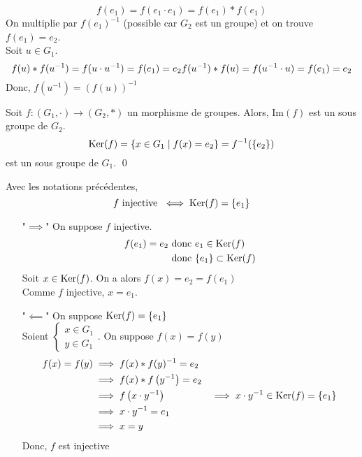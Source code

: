 \begin{prv}
	\[
	f(e_1) = f(e_1 \cdot e_1) = f(e_1) * f(e_1)
	\] On multiplie par $f(e_1)^{-1}$ (possible car $G_2$ est un groupe) et on trouve $f(e_1) = e_2$.\\
	Soit $u \in G_1$. \[
	f(u) * f(u ^{-1}) = f(u \cdot u^{-1}) = f(e_1) = e_2\\
	f(u^{-1}) * f(u) = f(u^{-1} \cdot u) = f(e_1) = e_2\\
	\] Donc, $f\left(u^{-1}\right) = \left( f(u) \right) ^{-1}$
\end{prv}

\begin{crlr}
	Soit $f: (G_1, \cdot) \to (G_2, *)$ un morphisme de groupes. Alors, $\mathrm{Im}(f)$ est un sous groupe de $G_2$. \[
	\operatorname{Ker}(f) =\{x \in G_1  \mid f(x) = e_2	\} = f^{-1}(\{e_2\}) 
	\] est un sous groupe de $G_1$.
	\qed
\end{crlr}

\begin{thm}
	Avec les notations précédentes, \[
		f\text{ injective } \iff \operatorname{Ker}(f) = \{e_1\} 
	\] 
\end{thm}

\begin{prv}
	\begin{itemize}
		\item["$\implies$"] On suppose $f$ injective.
			\begin{align*}
				f(e_1) = e_2 &\text{ donc }e_1 \in \operatorname{Ker}(f) \\
										 & \text{ donc } \{e_1\} \subset \operatorname{Ker}(f) \\
			\end{align*}
			Soit $x \in \operatorname{Ker}(f)$. On a alors $f(x) = e_2 = f(e_1)$ \\
			Comme $f$ injective, $x = e_1$.
		\item["$\impliedby$"] On suppose $\operatorname{Ker}(f) = \{e_1\}$\\
			Soient $\begin{cases}
				x \in G_1\\
				y \in G_1
			\end{cases}$. On suppose $f(x) = f(y)$
			\begin{align*}
				 f(x) = f(y) &\implies f(x) * f(y) ^{-1} = e_2\\
										 &\implies f(x) * f\left( y ^{-1} \right) = e_2\\
										 &\implies f\left(x \cdot y^{-1}\right)
										 &\implies x \cdot y^{-1} \in \operatorname{Ker}(f) = \{e_1\} \\
										 &\implies x \cdot y^{-1} = e_1\\
										 &\implies x = y
			\end{align*}
			Donc, $f$ est injective
	\end{itemize}
\end{prv}

